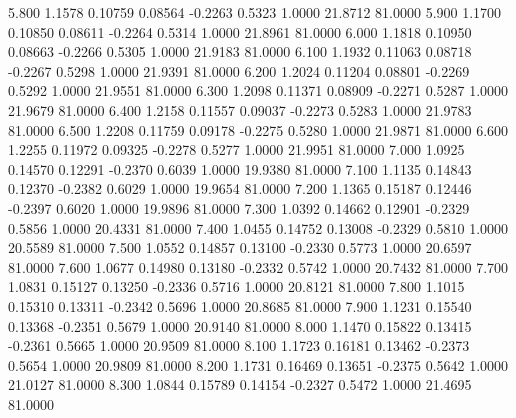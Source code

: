    5.800   1.1578   0.10759   0.08564  -0.2263   0.5323   1.0000  21.8712  81.0000
   5.900   1.1700   0.10850   0.08611  -0.2264   0.5314   1.0000  21.8961  81.0000
   6.000   1.1818   0.10950   0.08663  -0.2266   0.5305   1.0000  21.9183  81.0000
   6.100   1.1932   0.11063   0.08718  -0.2267   0.5298   1.0000  21.9391  81.0000
   6.200   1.2024   0.11204   0.08801  -0.2269   0.5292   1.0000  21.9551  81.0000
   6.300   1.2098   0.11371   0.08909  -0.2271   0.5287   1.0000  21.9679  81.0000
   6.400   1.2158   0.11557   0.09037  -0.2273   0.5283   1.0000  21.9783  81.0000
   6.500   1.2208   0.11759   0.09178  -0.2275   0.5280   1.0000  21.9871  81.0000
   6.600   1.2255   0.11972   0.09325  -0.2278   0.5277   1.0000  21.9951  81.0000
   7.000   1.0925   0.14570   0.12291  -0.2370   0.6039   1.0000  19.9380  81.0000
   7.100   1.1135   0.14843   0.12370  -0.2382   0.6029   1.0000  19.9654  81.0000
   7.200   1.1365   0.15187   0.12446  -0.2397   0.6020   1.0000  19.9896  81.0000
   7.300   1.0392   0.14662   0.12901  -0.2329   0.5856   1.0000  20.4331  81.0000
   7.400   1.0455   0.14752   0.13008  -0.2329   0.5810   1.0000  20.5589  81.0000
   7.500   1.0552   0.14857   0.13100  -0.2330   0.5773   1.0000  20.6597  81.0000
   7.600   1.0677   0.14980   0.13180  -0.2332   0.5742   1.0000  20.7432  81.0000
   7.700   1.0831   0.15127   0.13250  -0.2336   0.5716   1.0000  20.8121  81.0000
   7.800   1.1015   0.15310   0.13311  -0.2342   0.5696   1.0000  20.8685  81.0000
   7.900   1.1231   0.15540   0.13368  -0.2351   0.5679   1.0000  20.9140  81.0000
   8.000   1.1470   0.15822   0.13415  -0.2361   0.5665   1.0000  20.9509  81.0000
   8.100   1.1723   0.16181   0.13462  -0.2373   0.5654   1.0000  20.9809  81.0000
   8.200   1.1731   0.16469   0.13651  -0.2375   0.5642   1.0000  21.0127  81.0000
   8.300   1.0844   0.15789   0.14154  -0.2327   0.5472   1.0000  21.4695  81.0000
